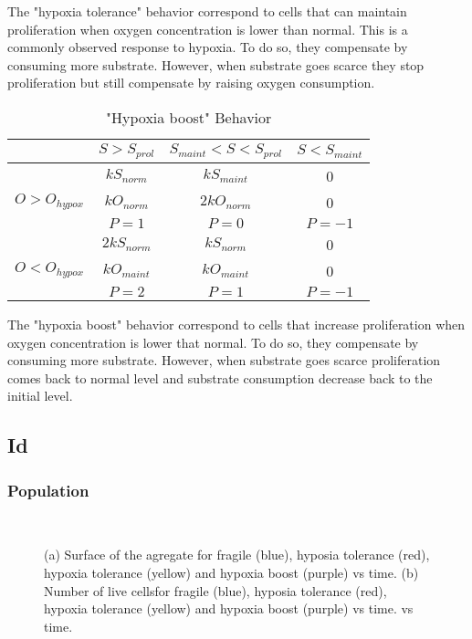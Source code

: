 \documentclass[11pt,a4paper]{article}
\begin{document}
The "hypoxia tolerance" behavior correspond to cells that can maintain proliferation when oxygen concentration is lower than normal. This is a commonly observed response to hypoxia.\cite{Shen2020}\cite{Jozwiak2014} To do so, they compensate by consuming more substrate. However, when substrate goes scarce they stop proliferation but still compensate by raising oxygen consumption.  

\begin{table}[h!]
\begin{center}
\begin{tabular}{ |c|c|c|c| }
\hline
 & \textbf{$S>S_{prol}$} & \textbf{$S_{maint}<S<S_{prol}$} & \textbf{$S<S_{maint}$} \\
\hline
 & $kS_{norm}$    &  $kS_{maint}$   & 0  \\
$O> O_{hypox}$ &  $kO_{norm}$   & $2kO_{norm}$ &  0 \\
 &  $P = 1$ & $P = 0$ & $P=-1$ \\
\hline
  & $2kS_{norm}$ & $kS_{norm}$ & 0 \\
$O< O_{hypox}$ & $kO_{maint}$ & $kO_{maint}$ & 0 \\
 & $P=2$  & $P=1$ & $P=-1$ \\
\hline
\end{tabular}
\caption{"Hypoxia boost" Behavior }
\end{center}
\end{table}

The "hypoxia boost" behavior correspond to cells that increase proliferation when oxygen concentration is lower that normal. To do so, they compensate by consuming more substrate. However, when substrate goes scarce proliferation comes back to normal level and substrate consumption decrease back to the initial level.\\ 

\newpage
\subsection{Id}
\subsubsection{Population}
\begin{figure}[h]
\begin{subfigure}{0.5\textwidth}
	\centering
	
	\caption{ \label{OS_area}}
\end{subfigure}
~~
\begin{subfigure}{0.5\textwidth}
	\centering
	
	\caption{\label{OS_live}}
\end{subfigure}
\caption{(a) Surface of the agregate for fragile (blue), hyposia tolerance (red), hypoxia tolerance (yellow) and hypoxia boost (purple) vs time. (b) Number of live cellsfor fragile (blue), hyposia tolerance (red), hypoxia tolerance (yellow) and hypoxia boost (purple) vs time. vs time. \label{OS_area_live}}
\end{figure}
\end{document}
